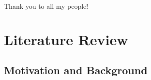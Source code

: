 \documentclass[print]{nuthesis}
\begin{document}
\begin{acknowledgments}
Thank you to all my people!
\end{acknowledgments}


\tableofcontents

\listoffigures
\listoftables

\mainmatter


\hypertarget{literature-review}{%
\chapter{Literature Review}\label{literature-review}}

\hypertarget{motivation-and-background}{%
\section{Motivation and Background}\label{motivation-and-background}}
\end{document}
